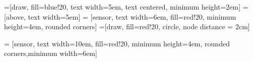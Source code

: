 \documentclass{article}
\begin{document}
	\pagestyle{empty}
	
	
	=[draw, fill=blue!20, text width=5em, 
	text centered, minimum height=2em]
	 = [above, text width=5em]
	 = [sensor, text width=6em, fill=red!20, 
	minimum height=4em, rounded corners]
	=[draw, fill=red!20, circle, node distance = 2cm]
	
	 = [sensor, text width=10em, fill=red!20, 
	minimum height=4em, rounded corners,minimum width=6em]
	
	\def\blockdist{2.5}
	\def\edgedist{2.5}
	
	
	
\end{document}

